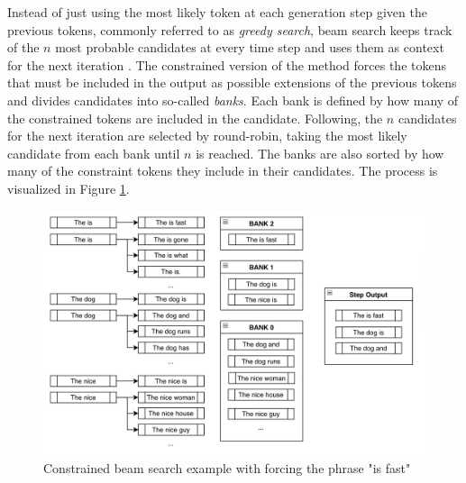 Instead of just using the most likely token at each generation step given the previous tokens, commonly referred to as \emph{greedy search}, beam search keeps track of the $n$ most probable candidates at every time step and uses them as context for the next iteration \cite{kim2022guiding}. The constrained version of the method forces the tokens that must be included in the output as possible extensions of the previous tokens and divides candidates into so-called \emph{banks}. Each bank is defined by how many of the constrained tokens are included in the candidate. Following, the $n$ candidates for the next iteration are selected by round-robin, taking the most likely candidate from each bank until $n$ is reached. The banks are also sorted by how many of the constraint tokens they include in their candidates. The process is visualized in Figure \ref{figure:constrained_beam_search_example}.  
\begin{figure}
    \centering
    \includegraphics[width=400pt]{resources/cbeam_2.jpg}
    \caption{Constrained beam search example with forcing the phrase "is fast" \cite{kim2022guiding}}
    \label{figure:constrained_beam_search_example}
\end{figure}